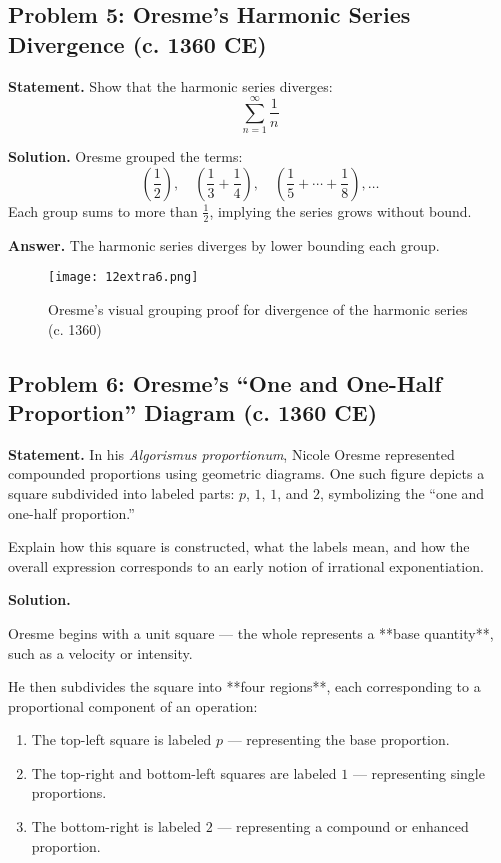 \documentclass[9pt]{article}
\begin{document}
\newpage

\subsection*{Problem 5: Oresme’s Harmonic Series Divergence (c. 1360 CE)}

\textbf{Statement.} Show that the harmonic series diverges:
\[
\sum_{n=1}^{\infty} \frac{1}{n}
\]

\textbf{Solution.} Oresme grouped the terms:
\[
\left( \frac{1}{2} \right),\quad \left( \frac{1}{3} + \frac{1}{4} \right),\quad \left( \frac{1}{5} + \cdots + \frac{1}{8} \right), \dots
\]
Each group sums to more than \( \frac{1}{2} \), implying the series grows without bound.

\textbf{Answer.} The harmonic series diverges by lower bounding each group.

\begin{figure}[H]
\centering
\texttt{[image: 12extra6.png]}
\caption{Oresme’s visual grouping proof for divergence of the harmonic series (c. 1360)}
\end{figure}

\newpage

\subsection*{Problem 6: Oresme’s “One and One-Half Proportion” Diagram (c. 1360 CE)}

\textbf{Statement.} In his \textit{Algorismus proportionum}, Nicole Oresme represented compounded proportions using geometric diagrams.  
One such figure depicts a square subdivided into labeled parts: \( p \), \( 1 \), \( 1 \), and \( 2 \), symbolizing the “one and one-half proportion.”

Explain how this square is constructed, what the labels mean, and how the overall expression corresponds to an early notion of irrational exponentiation.

\vspace{0.5em}

\textbf{Solution.}

Oresme begins with a unit square — the whole represents a **base quantity**, such as a velocity or intensity.

He then subdivides the square into **four regions**, each corresponding to a proportional component of an operation:

\begin{enumerate}
    \item The top-left square is labeled \( p \) — representing the base proportion.
    \item The top-right and bottom-left squares are labeled \( 1 \) — representing single proportions.
    \item The bottom-right is labeled \( 2 \) — representing a compound or enhanced proportion.
\end{enumerate}
\end{document}
